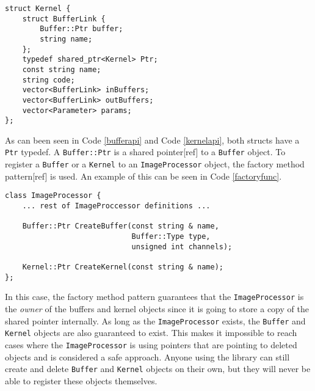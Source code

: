 \renewcommand{\lstlistingname}{Code}
\begin{lstlisting}[caption= Kernel struct, label=kernelapi]
struct Kernel {
    struct BufferLink {
        Buffer::Ptr buffer;
        string name;
    };
    typedef shared_ptr<Kernel> Ptr;
    const string name;
    string code;
    vector<BufferLink> inBuffers;
    vector<BufferLink> outBuffers;
    vector<Parameter> params;
};
\end{lstlisting}

As can been seen in Code \ref{bufferapi} and Code \ref{kernelapi}, both structs have a {\tt Ptr} typedef. A {\tt Buffer::Ptr} is a shared pointer[ref] to a {\tt Buffer} object. To register a {\tt Buffer} or a {\tt Kernel} to an {\tt ImageProcessor} object, the factory method pattern[ref] is used. An example of this can be seen in Code \ref{factoryfunc}.
\newline
\renewcommand{\lstlistingname}{Code}
\begin{lstlisting}[caption= Factory functions to create Buffer and Kernel objects, label=factoryfunc]
class ImageProcessor {
    ... rest of ImageProccessor definitions ...

    Buffer::Ptr CreateBuffer(const string & name,
                             Buffer::Type type,
                             unsigned int channels);

    Kernel::Ptr CreateKernel(const string & name);
};
\end{lstlisting}
In this case, the factory method pattern guarantees that the {\tt ImageProcessor} is the \emph{owner} of the buffers and kernel objects since it is going to store a copy of the shared pointer internally. As long as the {\tt ImageProcessor} exists, the {\tt Buffer} and {\tt Kernel} objects are also guaranteed to exist. This makes it impossible to reach cases where the {\tt ImageProcessor} is using pointers that are pointing to deleted objects and is considered a safe approach. Anyone using the library can still create and delete {\tt Buffer} and {\tt Kernel} objects on their own, but they will never be able to register these objects themselves.

